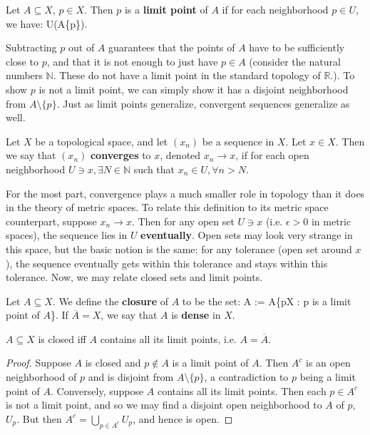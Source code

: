 	\begin{definition}
		Let $A\subseteq X$, $p\in X$. Then $p$ is a \textbf{limit point} of $A$ if for each neighborhood $p\in U$, we have:
		\eq
			U\cap(A\setminus\{p\})\neq\emptyset.
		\qe
	\end{definition}
	
	Subtracting $p$ out of $A$ guarantees that the points of $A$ have to be sufficiently close to $p$, and that it is not enough to just have $p\in A$ (consider 
	the natural numbers $\mathbb N$. These do not have a limit point in the standard topology of $\mathbb R$.). To show $p$ is not a limit point, we can 
	simply show it has a disjoint neighborhood from $A\setminus\{p\}$. Just as limit points generalize, convergent sequences generalize as well.
	
	\begin{definition}[Convergence]
		Let $X$ be a topological space, and let $(x_n)$ be a sequence in $X$. Let $x\in X$. Then we say that $(x_n)$ \textbf{converges} to $x$, denoted $x_n
		\rightarrow x$, if for each open neighborhood $U\ni x, \exists N\in\mathbb N$ such that $x_n\in U, \forall n > N$.
	\end{definition}
	
	For the most part, convergence plays a much smaller role in topology than it does in the theory of metric spaces. To relate this definition to its metric space 
	counterpart, suppose $x_n\rightarrow x$. Then for any open set $U\ni x$ (i.e. $\epsilon > 0$ in metric spaces), the sequence lies in $U$ \textbf{eventually}. 
	Open sets may look very strange in this space, but the basic notion is the same: for any tolerance (open set around $x$), the sequence eventually gets within 
	this tolerance and stays within this tolerance. Now, we may relate closed sets and limit points.
	
	\begin{definition}
		Let $A\subseteq X$. We define the \textbf{closure} of $A$ to be the set:
		\eq
			\overline A := A\cup\{p\in X : p \textnormal{ is a limit point of $A$}\}.
		\qe
		If $\overline A = X$, we say that $A$ is \textbf{dense} in $X$.
	\end{definition}
	
	\begin{theorem}
		$A\subseteq X$ is closed iff $A$ contains all its limit points, i.e. $A = \overline A$.
	\end{theorem}
	
	\begin{proof}
		Suppose $A$ is closed and $p\notin A$ is a limit point of $A$. Then $A^c$ is an open neighborhood of $p$ and is disjoint from $A\setminus\{p\}$, a contradiction to $p$ being a limit point of $A$. Conversely, suppose $A$ contains all its limit points. Then each $p\in A^c$ is not a limit point, and so we may find a disjoint open neighborhood to $A$ of $p$, $U_p$. But then $A^c = \bigcup_{p\in A^c} U_p$, and hence is open.
	\end{proof}
	

